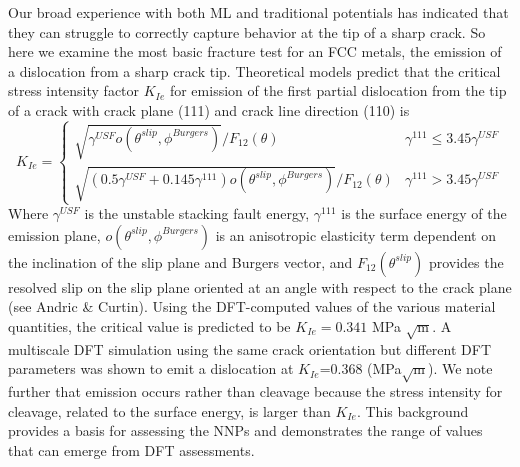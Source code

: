 \documentclass{article}
\begin{document}
Our broad experience with both ML and traditional potentials has indicated that they can struggle to correctly capture behavior at the tip of a sharp crack. 
So here we examine the most basic fracture test for an FCC metals, the emission of a dislocation from a sharp crack tip.
Theoretical models predict that the critical stress intensity factor $K_{Ie}$ for emission of the first partial dislocation from the tip of a crack with crack plane (111) and crack line direction (110) is
\begin{equation}
K_{Ie} =
\begin{cases}
\sqrt{\gamma^{USF}o(\theta^{slip},\phi^{Burgers})}/F_{12}(\theta) & \gamma^{111} \leq 3.45\gamma^{USF}\\
 \sqrt{(0.5\gamma^{USF}+0.145\gamma^{111})o(\theta^{slip},\phi^{Burgers})}/F_{12}(\theta) & \gamma^{111} > 3.45\gamma^{USF}
\end{cases}
\end{equation}
Where $\gamma^{USF}$ is the unstable stacking fault energy, $\gamma^{111}$  is the surface energy of the emission plane, $o(\theta^{slip},\phi^{Burgers})$ is an anisotropic elasticity term dependent on the inclination of the slip plane and Burgers vector, and $F_{12}(\theta^{slip})$ provides the resolved slip on the slip plane oriented at an angle with respect to the crack plane (see Andric \& Curtin\cite{Andric2019AtomisticFracture}).  Using the DFT-computed values of the various material quantities, the critical value is predicted to be $K_{Ie}=0.341$ MPa $\sqrt{\text{m}}$.  A multiscale DFT simulation using the same crack orientation but different DFT parameters\cite{Nair2011} was shown to emit a dislocation at $K_{Ie}$=0.368 (MPa$\sqrt{\text{m}}$).  We note further that emission occurs rather than cleavage because the stress intensity for cleavage, related to the surface energy, is larger than $K_{Ie}$.  This background provides a basis for assessing the NNPs and demonstrates the range of values that can emerge from DFT assessments.
\end{document}
